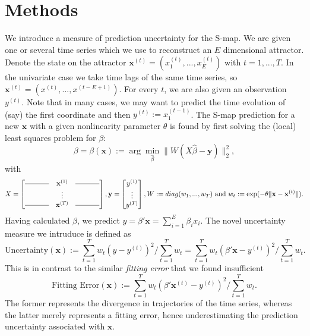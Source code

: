 \documentclass[fleqn,10pt]{wlscirep}
\newcommand{\un}{\text{Uncertainty}}
\newcommand{\x}{\mathbf{x}}
\begin{document}
\section{Methods}\label{section:methods}
We introduce a measure of prediction uncertainty for the S-map. We are
given one or several time series which we use to reconstruct an $E$
dimensional attractor. Denote the state on the attractor $\x^{(t)} =
(x_1^{(t)},...,x_E^{(t)})$ with $t=1,...,T$. In the univariate case we
take time lags of the same time series, so $\x^{(t)} =
(x^{(t)},...,x^{(t-E+1)})$. For every $t$, we are also given an
observation $y^{(t)}$. Note that in many cases, we may want to predict
the time evolution of (say) the first coordinate and then $y^{(t)} :=
x_1^{(t-1)}$. The S-map prediction for a new $\x$ with a given
nonlinearity parameter $\theta$ is found by first solving the (local)
least squares problem for $\beta$:
\begin{equation}
  \beta = \beta(\x) := \arg \min_{\hat{\beta}} \|W(X \hat{\beta} - \mathbf{y}) \|_2^2,
\end{equation}
with
\begin{equation*}
  X =
  \begin{bmatrix}
    \rule[.5ex]{3.5em}{0.4pt} & \x^{(1)} & \rule[.5ex]{3.5em}{0.4pt} \\
                              &  \vdots         &                 \\
    \rule[.5ex]{3.5em}{0.4pt} & \x^{(T)} & \rule[.5ex]{3.5em}{0.4pt} \\
  \end{bmatrix},
  \mathbf{y} =
  \begin{bmatrix}
    y^{(1)} \\
    \vdots \\
    y^{(T)}
  \end{bmatrix},
  W := diag( w_1,...,w_T)  \text{ and } w_t: =\exp( -\theta \| \x - \x^{(t)}\| ).
\end{equation*}
Having calculated $\beta$, we predict $y = \beta' \x = \sum_{i=1}^E \beta_i
x_i$. The novel uncertainty measure we intruduce is defined as
\begin{equation}\label{eq:uncertainty}
  \un (\x) := \sum_{t=1}^T w_t (y - y^{(t)})^2
  \bigg / \sum_{t=1}^T w_t = \sum_{t=1}^T w_t (\beta' \x -
  y^{(t)})^2 \bigg / \sum_{t=1}^T w_t.
\end{equation}
This is in contrast to the similar \emph{fitting error} that we found
insufficient
\begin{equation*}
\text{Fitting Error}(\x) := \sum_{t=1}^T w_t ( \beta'
\x^{(t)} - y^{(t)})^2 \bigg / \sum_{t=1}^T w_t.
\end{equation*}
The former represents the divergence in trajectories of the time
series, whereas the latter merely represents a fitting error, hence
underestimating the prediction uncertainty associated with
$\x$.
\end{document}
